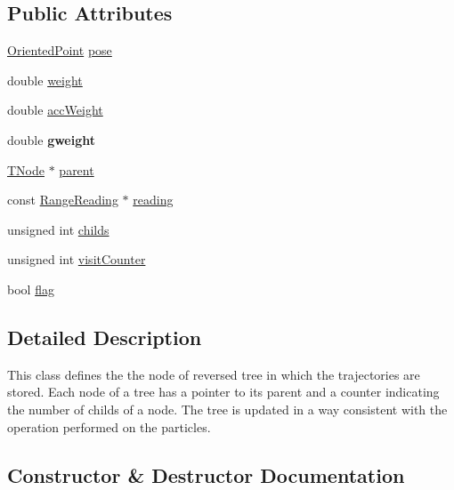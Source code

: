 \subsection*{Public Attributes}
\begin{DoxyCompactItemize}
\item 
\hyperlink{structGMapping_1_1orientedpoint}{Oriented\+Point} \hyperlink{structGMapping_1_1GridSlamProcessor_1_1TNode_a00ffad9f49ae467746aa211fbfaf4523}{pose}
\item 
double \hyperlink{structGMapping_1_1GridSlamProcessor_1_1TNode_ab30d02945ab4cba987bbc428f87b3028}{weight}
\item 
double \hyperlink{structGMapping_1_1GridSlamProcessor_1_1TNode_ab0c21a7a7fb16bd061f3b61cae8f55bd}{acc\+Weight}
\item 
\mbox{\label{structGMapping_1_1GridSlamProcessor_1_1TNode_a8163d6ff4d930d1762f9029b9f7162b3}} 
double {\bfseries gweight}
\item 
\hyperlink{structGMapping_1_1GridSlamProcessor_1_1TNode}{T\+Node} $\ast$ \hyperlink{structGMapping_1_1GridSlamProcessor_1_1TNode_aa96443473844405f417fb8170b3d7243}{parent}
\item 
const \hyperlink{classGMapping_1_1RangeReading}{Range\+Reading} $\ast$ \hyperlink{structGMapping_1_1GridSlamProcessor_1_1TNode_a574dd0cc9f28e7feb3d85a1ddb544d06}{reading}
\item 
unsigned int \hyperlink{structGMapping_1_1GridSlamProcessor_1_1TNode_a4c15378fddd812b0376ceb81c43be3e0}{childs}
\item 
unsigned int \hyperlink{structGMapping_1_1GridSlamProcessor_1_1TNode_aa5aa2b0e4bea309de90270cd56a2bd78}{visit\+Counter}
\item 
bool \hyperlink{structGMapping_1_1GridSlamProcessor_1_1TNode_a0d10763653ac0630632259c8c1e48e42}{flag}
\end{DoxyCompactItemize}


\subsection{Detailed Description}
This class defines the the node of reversed tree in which the trajectories are stored. Each node of a tree has a pointer to its parent and a counter indicating the number of childs of a node. The tree is updated in a way consistent with the operation performed on the particles. 

\subsection{Constructor \& Destructor Documentation}
\mbox{\label{structGMapping_1_1GridSlamProcessor_1_1TNode_a7742a4335c17d489467af9bbd21334ef}} 
